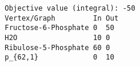 \begin{verbatim}
Objective value (integral): -50
Vertex/Graph         In Out 
Fructose-6-Phosphate 0  50  
H2O                  10 0   
Ribulose-5-Phosphate 60 0   
p_{62,1}             0  10  
\end{verbatim}
